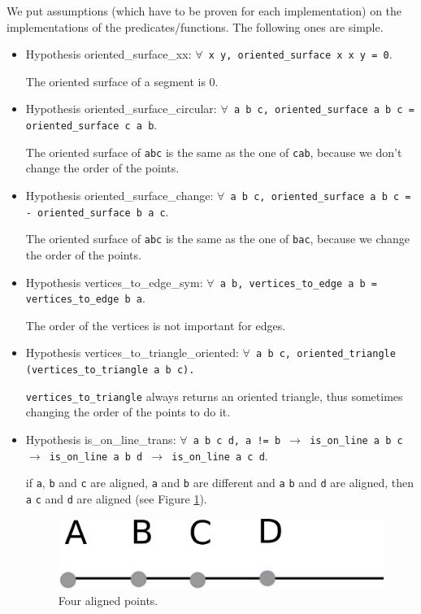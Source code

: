\documentclass[a4paper,10pt]{article}
\def\hypothesis#1#2{{\color{purple}Hypothesis} {\color{blue}#1}: {\tt #2}}
\begin{document}
We put assumptions (which have to be proven for each implementation) on the implementations of the predicates/functions. The following ones are simple.
\begin{itemize}
\item \hypothesis{oriented\_surface\_xx}{$\forall$ x y, {\tt oriented\_surface x x y} = 0}.
  
  The oriented surface of a segment is 0.
\item \hypothesis{oriented\_surface\_circular}{$\forall$ a b c, oriented\_surface a b c = oriented\_surface c a b}.
  
  The oriented surface of {\tt abc} is the same as the one of {\tt cab}, because we don't change the order of the points.
\item \hypothesis{oriented\_surface\_change}{$\forall$ a b c, oriented\_surface a b c = - oriented\_surface b a c}.
  
  The oriented surface of {\tt abc} is the same as the one of {\tt bac}, because we change the order of the points.
\item \hypothesis{vertices\_to\_edge\_sym}{$\forall$ a b, vertices\_to\_edge a b = vertices\_to\_edge b a}.

  The order of the vertices is not important for edges.
  \item 
    \hypothesis{vertices\_to\_triangle\_oriented}{$\forall$ a b c, oriented\_triangle (vertices\_to\_triangle a b c).}

    {\tt vertices\_to\_triangle} always returns an oriented triangle, thus sometimes changing the order of the points to do it.
\item\hypothesis{is\_on\_line\_trans}{$\forall$ a b c d, a != b $\rightarrow$ is\_on\_line a b c $\rightarrow$ is\_on\_line a b d $\rightarrow$
    is\_on\_line a c d}.
  
  if {\tt a}, {\tt b} and {\tt c} are aligned, {\tt a} and {\tt b} are different and {\tt a} {\tt b} and {\tt d} are aligned, then {\tt a} {\tt c} and {\tt d} are aligned (see Figure \ref{aligned}).

  \begin{figure}
    \centering
    \includegraphics{aligned}
    \caption{\label{aligned} Four aligned points.}
  \end{figure}
  

\end{itemize}
\end{document}
